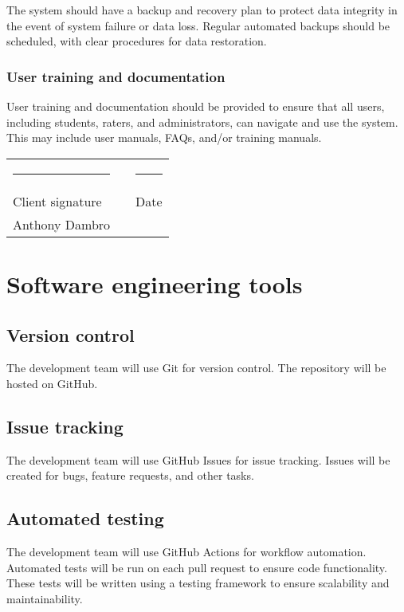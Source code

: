 \documentclass[letterpaper,article,oneside]{memoir}
\begin{document}
The system should have a backup and recovery plan to protect data integrity in the event of system failure or data loss.
Regular automated backups should be scheduled, with clear procedures for data restoration.

\subsection{User training and documentation}

User training and documentation should be provided to ensure that all users, including \glspl{student}, \glspl{rater}, and \glspl{administrator}, can navigate and use the system.
This may include user manuals, FAQs, and/or training manuals.

\vfill

\vspace*{1in}
\begin{tabularx}{\textwidth}{XcX}
  \hrule           & \hspace*{3em} & \hrule \\
  Client signature &               & Date   \\
  Anthony Dambro  
\end{tabularx}

\newpage
\appendix
\addappheadtotoc


\renewcommand{\chapterheadstart}{\vspace{\beforechapskip}}

\chapter{Software engineering tools}

\section{Version control}

The development team will use Git for version control.
The repository will be hosted on GitHub.

\section{Issue tracking}

The development team will use GitHub Issues for issue tracking.
Issues will be created for bugs, feature requests, and other tasks.

\section{Automated testing}

The development team will use GitHub Actions for workflow automation.
Automated tests will be run on each pull request to ensure code functionality.
These tests will be written using a testing framework to ensure scalability and maintainability.

\end{document}
